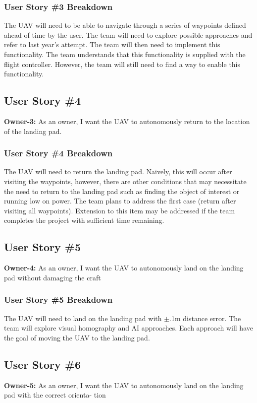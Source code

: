 \subsubsection{User Story \#3 Breakdown}
The UAV will need to be able to navigate through a series of waypoints defined ahead of time by the user. The team will need to explore possible approaches and refer to last year's attempt. The team will then need to implement this functionality. The team understands that this functionality is supplied with the flight controller. However, the team will still need to find a way to enable this functionality.\\

\subsection{User Story \#4} 
\textbf{Owner-3:} As an owner, I want the UAV to autonomously return to the location of the landing pad.

\subsubsection{User Story \#4 Breakdown}
The UAV will need to return the landing pad. Naively, this will occur after visiting the waypoints, however, there are other conditions that may necessitate the need to return to the landing pad such as finding the object of interest or running low on power. The team plans to address the first case (return after visiting all waypoints). Extension to this item may be addressed if the team completes the project with sufficient time remaining.\\ 


\subsection{User Story \#5} 
\textbf{Owner-4:} As an owner, I want the UAV to autonomously land on the landing pad without damaging the
craft

\subsubsection{User Story \#5 Breakdown}
The UAV will need to land on the landing pad with $\pm$.1m distance error. The team will explore visual homography and AI approaches. Each approach will have the goal of moving the UAV to the landing pad.\\ 


\subsection{User Story \#6} 
\textbf{Owner-5:} As an owner, I want the UAV to autonomously land on the landing pad with the correct orienta-
tion

